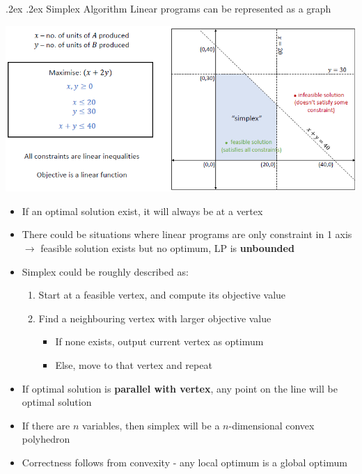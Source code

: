 \documentclass[10pt,landscape,a4paper]{article}
\makeatletter
\renewcommand{\subsection}{\@startsection{subsection}{1}{0mm}%
    {.2ex}%
    {.2ex}%
    {\sffamily\bfseries}}
\makeatother
\begin{document}
\begin{multicols*}{4}
	\subsection{Simplex Algorithm}
	Linear programs can be represented as a graph
	\begin{center}
		\includegraphics[width=0.7\columnwidth]{simplex}
	\end{center}
	\begin{itemize}
		\item If an optimal solution exist, it will always be at a vertex
		\item There could be situations where linear programs are only constraint in 1 axis $\rightarrow$ feasible solution exists but no optimum, LP is \textbf{unbounded}
		\item Simplex could be roughly described as:
		      \begin{enumerate}
			      \item Start at a feasible vertex, and compute its objective value
			      \item Find a neighbouring vertex with larger objective value
			            \begin{itemize}
				            \item If none exists, output current vertex as  optimum
				            \item Else, move to that vertex and repeat
			            \end{itemize}
		      \end{enumerate}
		\item If optimal solution is\textbf{ parallel with vertex}, any point on the line will be optimal solution
		\item If there are $n$ variables, then simplex will be a $n$-dimensional convex polyhedron
		\item Correctness follows from convexity - any local optimum is a global optimum
	\end{itemize}

\end{multicols*}
\end{document}
